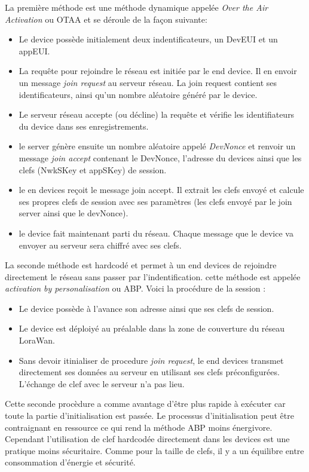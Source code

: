 La première méthode est une méthode dynamique appelée \textit{Over the Air Activation} ou OTAA et se déroule de la façon suivante: 
\begin{itemize}
\item Le device possède initialement deux indentificateurs, un DevEUI et un appEUI.
\item La requête pour rejoindre le réseau est initiée par le end device. Il en envoir un message \textit{join request} au serveur réseau. La join request contient ses identificateurs, ainsi qu'un nombre aléatoire généré par le device.
\item Le serveur réseau accepte (ou décline) la requête et vérifie les identifiateurs du device dans ses enregistrements. 
\item le server génère ensuite un nombre aléatoire appelé \textit{DevNonce} et renvoir un message \textit{join accept} contenant le DevNonce, l'adresse du devices ainsi que les clefs (NwkSKey et appSKey) de session.
\item le en devices reçoit le message join accept. Il extrait les clefs envoyé et calcule ses propres clefs de session avec ses paramètres (les clefs envoyé par le join server ainsi que le devNonce).
\item le device fait maintenant parti du réseau. Chaque message que le device va envoyer au serveur sera chiffré avec ses clefs.
\end{itemize}
        
La seconde méthode est hardcodé et permet à un end devices de rejoindre directement le réseau sans passer par l'indentification. cette méthode est appelée \textit{activation by personalisation} ou ABP. Voici la procédure de la session :
\begin{itemize}
\item Le device possède à l'avance son adresse ainsi que ses clefs de session.
\item Le device est déploiyé au préalable dans la zone de couverture du réseau LoraWan.
\item Sans devoir itinialiser de procedure \textit{join request}, le end devices transmet directement ses données au serveur en utilisant ses clefs préconfigurées. L'échange de clef avec le serveur n'a pas lieu.
\end{itemize}

Cette seconde procèdure a comme avantage d'être plus rapide à exécuter car toute la partie d'initialisation est passée. Le processus d'initialisation peut être contraignant en ressource ce qui rend la méthode ABP moins énergivore. Cependant l'utilisation de clef hardcodée directement dans les devices est une pratique moins sécuritaire. Comme pour la taille de clefs, il y a un équilibre entre consommation d'énergie et sécurité.
